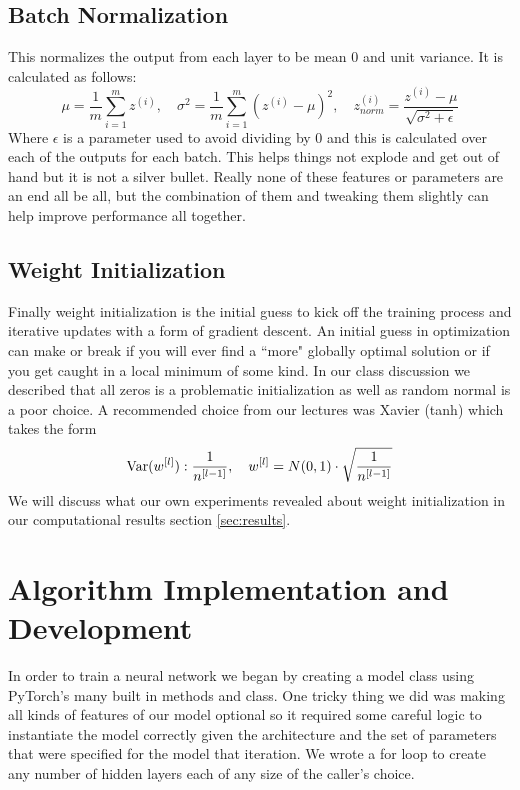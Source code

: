 \documentclass[11pt]{amsart}
\begin{document}
\subsection{Batch Normalization}
This normalizes the output from each layer to be mean 0 and unit variance.
It is calculated as follows:
\begin{equation}
\mu = \frac 1 m \sum_{i = 1}^m z^{(i)}, \quad
\sigma^2 = \frac 1 m \sum_{i = 1}^m \left( z^{(i)} - \mu \right)^2, \quad
z_{norm}^{(i)} = \frac {z^{(i)} - \mu}{\sqrt{\sigma^2 + \epsilon}}
\label{eq:bn}
\end{equation}
Where $\epsilon$ is a parameter used to avoid dividing by 0 and this is calculated over each of the outputs for each batch.
This helps things not explode and get out of hand but it is not a silver bullet.
Really none of these features or parameters are an end all be all, but the combination of them and tweaking them slightly can help improve performance all together.

\subsection{Weight Initialization}
Finally weight initialization is the initial guess to kick off the training process and iterative updates with a form of gradient descent.
An initial guess in optimization can make or break if you will ever find a ``more" globally optimal solution or if you get caught in a local minimum of some kind.
In our class discussion we described that all zeros is a problematic initialization as well as random normal is a poor choice.
A recommended choice from our lectures was Xavier (tanh) which takes the form
\begin{equation}
{\rm Var} ( w^{[l]}): \frac 1 {n^{[l - 1]}}, \quad 
w^{[l]} = N(0, 1) \cdot \sqrt{ \frac 1 {n^{[l - 1]}} }
\label{eq:weight_init}
\end{equation}
We will discuss what our own experiments revealed about weight initialization in our computational results section \ref{sec:results}.

\section{Algorithm Implementation and Development}\label{sec:algorithms}
In order to train a neural network we began by creating a model class using PyTorch's \cite{Ansel_PyTorch_2_Faster_2024} many built in methods and class.
One tricky thing we did was making all kinds of features of our model optional so it required some careful logic to instantiate the model correctly given the architecture and the set of parameters that were specified for the model that iteration.
We wrote a for loop to create any number of hidden layers each of any size of the caller's choice.
\end{document}
